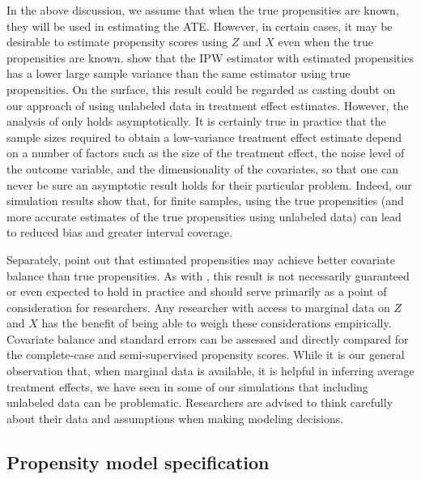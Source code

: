\documentclass[aos]{imsart}
\begin{document}
In the above discussion, we assume that when the true propensities are known, they will be used in estimating the ATE. However, in certain cases, 
it may be desirable to estimate propensity scores using $Z$ and $X$ even when the true propensities are known. \cite{lunceford2004stratification} show that the IPW estimator 
with estimated propensities has a lower large sample variance than the same estimator using true propensities. On the surface, this result could be regarded as casting doubt on our 
approach of using unlabeled data in treatment effect estimates. However, the analysis of \cite{lunceford2004stratification} only holds asymptotically. 
It is certainly true in practice that the sample sizes required to obtain a low-variance treatment effect estimate depend on a number of factors such as the size of the treatment effect, 
the noise level of the outcome variable, and the dimensionality of the covariates, so that one can never be sure an asymptotic result holds for their particular problem. 
Indeed, our simulation results show that, for finite samples, using the true propensities (and more accurate estimates of the true propensities 
using unlabeled data) can lead to reduced bias and greater interval coverage.

Separately, \cite{imbens2015causal} point out that estimated propensities may achieve better covariate balance than true propensities. As with \cite{lunceford2004stratification}, 
this result is not necessarily guaranteed or even expected to hold in practice and should serve primarily as a point of consideration for researchers. Any researcher with access to 
marginal data on $Z$ and $X$ has the benefit of being able to weigh these considerations empirically. Covariate balance and standard errors can be assessed and directly compared 
for the complete-case and semi-supervised propensity scores. While it is our general observation that, when marginal data is available, it is helpful in inferring average treatment effects, 
we have seen in some of our simulations that including unlabeled data can be problematic. Researchers are advised to think carefully about their data and assumptions when 
making modeling decisions.

\subsection{Propensity model specification}
\label{subsection:overfitprop}
\end{document}
